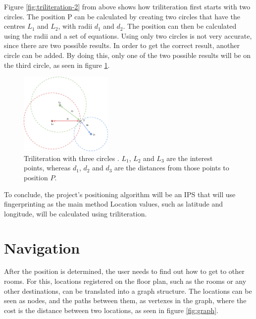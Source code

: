 Figure \ref{fig:triliteration-2} from above shows how triliteration first starts with two circles. The position P can be calculated by creating two circles that have the centres $L_1$ and $L_2$, with radii $d_1$ and $d_2$. The position can then be calculated using the radii and a set of equations. Using only two circles is not very accurate, since there are two possible results. In order to get the correct result, another circle can be added. By doing this, only one of the two possible results will be on the third circle, as seen in figure \ref{fig:triliteration-3}.

\begin{figure}[H]
    \centering
    \includegraphics[width=170px, height=150px]{res/Trilateration3.png}
    \centering
    \caption{Triliteration with three circles \cite{triliteration-image}. $L_1$, $L_2$ and $L_3$ are the interest points, whereas $d_1$, $d_2$ and $d_3$ are the distances from those points to position $P$.}
    \label{fig:triliteration-3}
\end{figure}


To conclude, the project's positioning algorithm will be an IPS that will use fingerprinting as the main method Location values, such as latitude and longitude, will be calculated using triliteration.

\newpage
\section{Navigation}
After the position is determined, the user needs to find out how to get to other rooms. For this, locations registered on the floor plan, such as the rooms or any other destinations, can be translated into a graph structure. The locations can be seen as nodes, and the paths between them, as vertexes in the graph, where the cost is the distance between two locations, as seen in figure \ref{fig:graph}.

